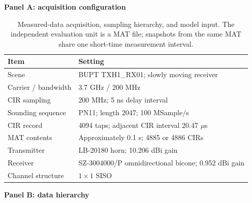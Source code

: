 \begin{table}[H]
\centering
\caption{Measured-data acquisition, sampling hierarchy, and model input. The independent evaluation
unit is a MAT file; snapshots from the same MAT share one short-time measurement interval.}
\label{tab:bupt-config}
\scriptsize
\setlength{\tabcolsep}{3.0pt}
\renewcommand{\arraystretch}{1.05}
\textbf{Panel A: acquisition configuration}\par\vspace{2pt}
\begin{tabular}{p{}p{}}
\toprule
\textbf{Item} & \textbf{Setting} \\
\midrule
Scene & BUPT TXH1\_RX01; slowly moving receiver \\
Carrier / bandwidth & 3.7 GHz / 200 MHz \\
CIR sampling & 200 MHz; 5 ns delay interval \\
Sounding sequence & PN11; length 2047; 100 MSample/s \\
CIR record & 4094 taps; adjacent CIR interval 20.47 \(\mu\)s \\
MAT contents & Approximately 0.1 s; 4885 or 4886 CIRs \\
Transmitter & LB-20180 horn; 10.206 dBi gain \\
Receiver & SZ-3004000/P omnidirectional bicone; 0.952 dBi gain \\
Channel structure & \(1\times1\) SISO \\
\bottomrule
\end{tabular}

\vspace{4pt}
\textbf{Panel B: data hierarchy}\par\vspace{2pt}
\end{table}


